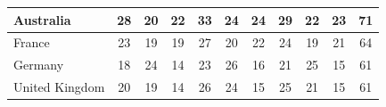 \documentclass[12pt]{article}  %
\begin{document}
\begin{subappendices}
\begin{longtable}{|l|c|c|c|c|c|c|c|c|c|c|}
	\hline
	Australia                                                      & 28                                                                     & 20                                                                     & 22                                                                     & 33                                                                     & 24                                                                     & 24                                                                     & 29                        & 22                          & 23                          & 71                          \\ 
	\hline
	France                                                         & 23                                                                     & 19                                                                     & 19                                                                     & 27                                                                     & 20                                                                     & 22                                                                     & 24                        & 19                          & 21                          & 64                          \\ 
	\hline
	Germany                                                        & 18                                                                     & 24                                                                     & 14                                                                     & 23                                                                     & 26                                                                     & 16                                                                     & 21                        & 25                          & 15                          & 61                          \\ 
	\hline
	United Kingdom                                                 & 20                                                                     & 19                                                                     & 14                                                                     & 26                                                                     & 24                                                                     & 15                                                                     & 25                        & 21                          & 15                          & 61                          \\ 

\end{longtable}
\end{subappendices}
\end{document}

